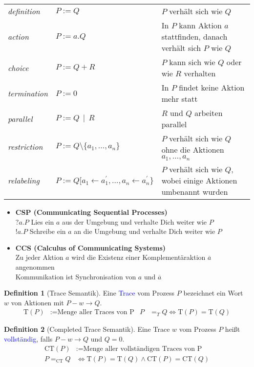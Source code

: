 \documentclass{scrreprt}
\theoremstyle{definition}
\newtheorem{Definition}{Definition}[section]
\theoremstyle{example}
\theoremstyle{algorithm}
\begin{document}
\begin{tabularx}{\linewidth}{llX}
\textit{definition}&$P:=Q$&$P$ verhält sich wie $Q$\\
\textit{action}&$P:=a.Q$&In $P$ kann Aktion $a$ stattfinden, danach verhält sich $P$ wie $Q$\\
\textit{choice}&$P:=Q+R$&$P$ kann sich wie $Q$ oder wie $R$ verhalten\\
\textit{termination}&$P:=0$&In $P$ findet keine Aktion mehr statt\\
\textit{parallel}&$P:=Q\,\mid\, R$&$R$ und $Q$ arbeiten parallel\\
\textit{restriction}&$P:=Q\setminus \{a_1,\ldots,a_n\}$&$P$ verhält sich wie $Q$ ohne die Aktionen $a_1,\ldots,a_n$\\
\textit{relabeling}&$P:=Q[a_1 \leftarrow a_1^\prime,\ldots,a_n \leftarrow a_n^\prime\}$&$P$ verhält sich wie $Q$, wobei einige Aktionen umbenannt wurden\\
\end{tabularx}

\begin{itemize}
\item
\textbf{CSP (Communicating Sequential Processes)}\\
$?a.P$ Lies ein $a$ aus der Umgebung und verhalte Dich weiter wie $P$\\
$!a.P$ Schreibe ein $a$ an die Umgebung und verhalte Dich weiter wie $P$
\item
\textbf{CCS (Calculus of Communicating Systems)}\\
Zu jeder Aktion $a$ wird die Existenz einer Komplementäraktion $\overline{a}$ angenommen\\
Kommunikation ist Synchronisation von $a$ und $\overline{a}$\\
\end{itemize}

\begin{Definition}[Trace Semantik]
Eine \textcolor{blue}{Trace} vom Prozess $P$ bezeichnet ein Wort $w$ von Aktionen mit $P-w\rightarrow Q$.
\begin{align*}
\text{T}(P)&:=\text{Menge aller Traces von P}&P&=_T Q \Leftrightarrow \text{T}(P)=\text{T}(Q)
\end{align*}
\end{Definition}

\begin{Definition}[Completed Trace Semantik]
Eine Trace $w$ vom Prozess $P$ heißt \textcolor{blue}{vollständig}, falls $P-w\rightarrow Q$ und $Q=0$.
\begin{align*}
\text{CT}(P)&:=\text{Menge aller vollständigen Traces von P}\\
P=_\text{CT} Q &\Leftrightarrow \text{T}(P)=\text{T}(Q) \land \text{CT}(P)=\text{CT}(Q)
\end{align*}
\end{Definition}
\end{document}
